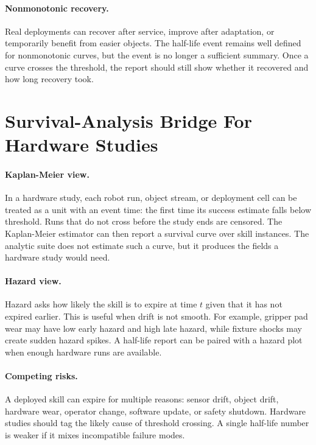 \documentclass{article}
\begin{document}
\paragraph{Nonmonotonic recovery.}
Real deployments can recover after service, improve after adaptation, or
temporarily benefit from easier objects. The half-life event remains well
defined for nonmonotonic curves, but the event is no longer a sufficient
summary. Once a curve crosses the threshold, the report should still show
whether it recovered and how long recovery took.

\section{Survival-Analysis Bridge For Hardware Studies}

\paragraph{Kaplan-Meier view.}
In a hardware study, each robot run, object stream, or deployment cell can be
treated as a unit with an event time: the first time its success estimate falls
below threshold. Runs that do not cross before the study ends are censored.
The Kaplan-Meier estimator can then report a survival curve over skill
instances. The analytic suite does not estimate such a curve, but it produces
the fields a hardware study would need.

\paragraph{Hazard view.}
Hazard asks how likely the skill is to expire at time $t$ given that it has not
expired earlier. This is useful when drift is not smooth. For example, gripper
pad wear may have low early hazard and high late hazard, while fixture shocks
may create sudden hazard spikes. A half-life report can be paired with a hazard
plot when enough hardware runs are available.

\paragraph{Competing risks.}
A deployed skill can expire for multiple reasons: sensor drift, object drift,
hardware wear, operator change, software update, or safety shutdown. Hardware
studies should tag the likely cause of threshold crossing. A single half-life
number is weaker if it mixes incompatible failure modes.
\end{document}
